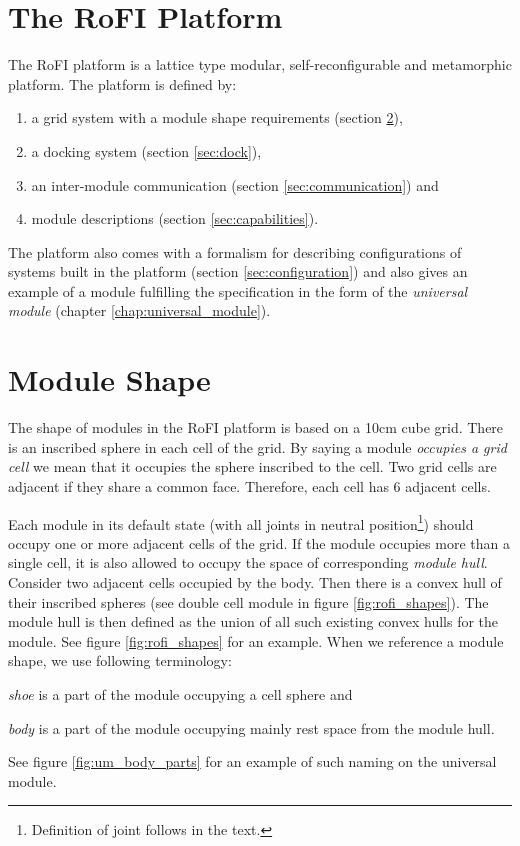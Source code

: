 \section{The RoFI Platform }

The RoFI platform is a lattice type modular, self-reconfigurable and metamorphic
platform. The platform is defined by:
\begin{enumerate}
    \item a grid system with a module shape requirements (section \ref{sec:aware}),
    \item a docking system (section \ref{sec:dock}),
    \item an inter-module communication (section \ref{sec:communication}) and
    \item module descriptions (section \ref{sec:capabilities}).
\end{enumerate}

The platform also comes with a formalism for describing configurations of
systems built in the platform (section \ref{sec:configuration}) and also gives
an example of a module fulfilling the specification in the form of the
\emph{universal module} (chapter \ref{chap:universal_module}).

\section{Module Shape}\label{sec:aware}

The shape of modules in the RoFI platform is based on a 10cm cube grid. There is
an inscribed sphere in each cell of the grid. By saying a module \emph{occupies
a grid cell} we mean that it occupies the sphere inscribed to the cell. Two grid
cells are adjacent if they share a common face. Therefore, each cell has 6
adjacent cells.

Each module in its default state (with all joints in neutral
position\footnote{Definition of joint follows in the text.}) should occupy one
or more adjacent cells of the grid. If the module occupies more than a single
cell, it is also allowed to occupy the space of corresponding \emph{module
hull}. Consider two adjacent cells occupied by the body. Then there is a convex
hull of their inscribed spheres (see double cell module in figure
\ref{fig:rofi_shapes}). The module hull is then defined as the union of all such
existing convex hulls for the module. See figure \ref{fig:rofi_shapes} for an
example. When we reference a module shape, we use following terminology:
\begin{enumerate*}
    \item \emph{shoe} is a part of the module occupying a cell sphere and
    \item \emph{body} is a part of the module occupying mainly rest space from
    the module hull.
\end{enumerate*}
See figure \ref{fig:um_body_parts} for an example of such naming on the
universal module.

